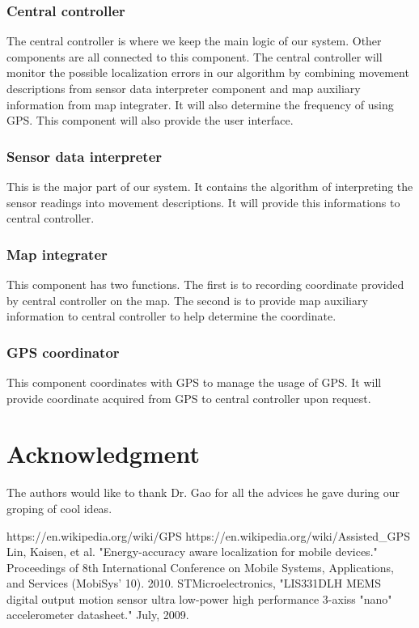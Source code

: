 \documentclass[journal]{IEEEtran}
\begin{document}
\subsubsection{Central controller}
The central controller is where we keep the main logic of our system. 
Other components are all connected to this component. 
The central controller will monitor the possible localization errors in our algorithm by combining movement descriptions from  sensor data interpreter component and map auxiliary information from map integrater.
It will also determine the frequency of using GPS.
This component will also provide the user interface.

\subsubsection{Sensor data interpreter}
This is the major part of our system. 
It contains the algorithm of interpreting the sensor readings into movement descriptions. 
It will provide this informations to central controller.

\subsubsection{Map integrater}
This component has two functions. 
The first is to recording coordinate provided by central controller on the map.
The second is to provide map auxiliary information to central controller to help determine the coordinate.

\subsubsection{GPS coordinator}
This component coordinates with GPS to manage the usage of GPS.
It will provide coordinate acquired from GPS to central controller upon request.

\section*{Acknowledgment}
The authors would like to thank Dr. Gao for all the advices he gave during our groping of cool ideas.

\ifCLASSOPTIONcaptionsoff
  \newpage
\fi

\begin{thebibliography}{1}

	https://en.wikipedia.org/wiki/GPS
	https://en.wikipedia.org/wiki/Assisted\_GPS
	Lin, Kaisen, et al. "Energy-accuracy aware localization for mobile devices." Proceedings of 8th International Conference on Mobile Systems, Applications, and Services (MobiSys’ 10). 2010.
	STMicroelectronics, "LIS331DLH MEMS digital output motion sensor ultra low-power high performance 3-axiss "nano" accelerometer datasheet." July, 2009.

\end{thebibliography}


\end{document}
